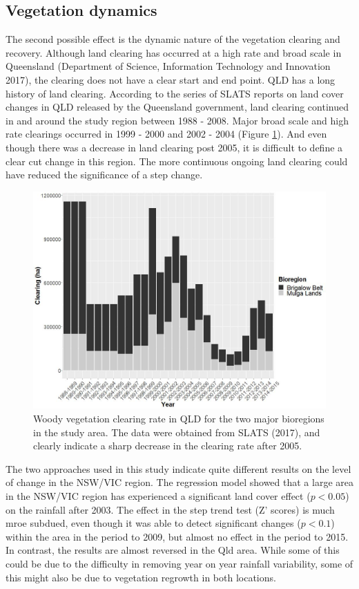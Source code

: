 \documentclass[]{elsarticle} %
\theoremstyle{definition}
\theoremstyle{definition}
\theoremstyle{definition}
\theoremstyle{remark}
\begin{document}
\subsection{Vegetation dynamics}\label{vegetation-dynamics}

The second possible effect is the dynamic nature of the vegetation
clearing and recovery. Although land clearing has occurred at a high
rate and broad scale in Queensland (Department of Science, Information
Technology and Innovation 2017), the clearing does not have a clear
start and end point. QLD has a long history of land clearing. According
to the series of SLATS reports on land cover changes in QLD released by
the Queensland government, land clearing continued in and around the
study region between 1988 - 2008. Major broad scale and high rate
clearings occurred in 1999 - 2000 and 2002 - 2004 (Figure
\ref{fig:slat}). And even though there was a decrease in land clearing
post 2005, it is difficult to define a clear cut change in this region.
The more continuous ongoing land clearing could have reduced the
significance of a step change.

\begin{figure}
\includegraphics[width=0.9\linewidth]{figures/slats} \caption{Woody vegetation clearing rate in QLD for the two major bioregions in the study area. The data were obtained from SLATS (2017), and clearly indicate a sharp decrease in the clearing rate after 2005.}\label{fig:slat}
\end{figure}

The two approaches used in this study indicate quite different results
on the level of change in the NSW/VIC region. The regression model
showed that a large area in the NSW/VIC region has experienced a
significant land cover effect (\(p < 0.05\)) on the rainfall after 2003.
The effect in the step trend test (Z' scores) is much mroe subdued, even
though it was able to detect significant changes (\(p < 0.1\)) within
the area in the period to 2009, but almost no effect in the period to
2015. In contrast, the results are almost reversed in the Qld area.
While some of this could be due to the difficulty in removing year on
year rainfall variability, some of this might also be due to vegetation
regrowth in both locations.
\end{document}
